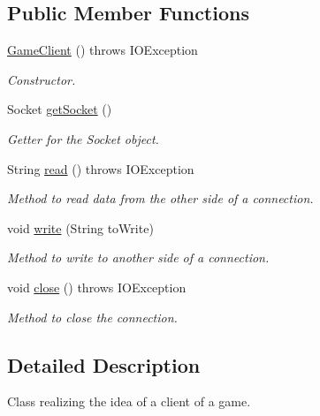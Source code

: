 \subsection*{Public Member Functions}
\begin{DoxyCompactItemize}
\item 
\hyperlink{classGameClient_a19758271b7b5a53ba372893c0adfc0e1}{Game\+Client} ()  throws I\+O\+Exception 
\begin{DoxyCompactList}\small\item\em Constructor. \end{DoxyCompactList}\item 
Socket \hyperlink{classGameClient_aecd4af8ab8269224d8a64f8dd742727b}{get\+Socket} ()
\begin{DoxyCompactList}\small\item\em Getter for the Socket object. \end{DoxyCompactList}\item 
String \hyperlink{classGameClient_adabd0d577d18af7d8d740a40c8ba071b}{read} ()  throws I\+O\+Exception 
\begin{DoxyCompactList}\small\item\em Method to read data from the other side of a connection. \end{DoxyCompactList}\item 
void \hyperlink{classGameClient_a553f6df87097e02fd5b35e96e5005e7a}{write} (String to\+Write)
\begin{DoxyCompactList}\small\item\em Method to write to another side of a connection. \end{DoxyCompactList}\item 
void \hyperlink{classGameClient_a7f4a27d2857721b96ef4be91e5b22c87}{close} ()  throws I\+O\+Exception \hypertarget{classGameClient_a7f4a27d2857721b96ef4be91e5b22c87}{}\label{classGameClient_a7f4a27d2857721b96ef4be91e5b22c87}

\begin{DoxyCompactList}\small\item\em Method to close the connection. \end{DoxyCompactList}\end{DoxyCompactItemize}


\subsection{Detailed Description}
Class realizing the idea of a client of a game. 

